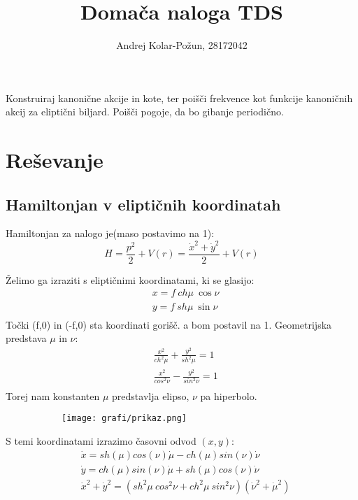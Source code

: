\documentclass{article}
\title{Domača naloga TDS}
\author{Andrej Kolar-Požun, 28172042}
\begin{document}
\maketitle
\newpage
{}


Konstruiraj kanonične akcije in kote, ter poišči frekvence kot funkcije kanoničnih akcij za eliptični biljard. Poišči pogoje, da bo gibanje
periodično.


\section{Reševanje}
\subsection{Hamiltonjan v eliptičnih koordinatah}
Hamiltonjan za nalogo je(maso postavimo na 1):
\begin{equation*}
H = \frac{p^2}{2} + V(r) = \frac{\dot{x}^2 + \dot{y}^2}{2} + V(r)
\end{equation*}

Želimo ga izraziti s eliptičnimi koordinatami, ki se glasijo:
\begin{align*}
&x= f \ ch \mu \ \cos \nu \\
&y = f\  sh \mu \  \sin \nu \\
\end{align*}
Točki (f,0) in (-f,0) sta koordinati gorišč. a bom postavil na 1. 
Geometrijska predstava $\mu$ in $\nu$:
\begin{align*}
& \frac{x^2}{ ch^2 \mu} + \frac{y^2}{ sh^2 \mu} = 1 \\
& \frac{x^2}{ cos^2 \nu} - \frac{y^2}{ sin^2 \nu} = 1 \\
\end{align*}
Torej nam konstanten $\mu$ predstavlja elipso, $\nu$ pa hiperbolo.

\begin{figure}[H]
\centering
\begin{subfigure}{.7\textwidth}
\texttt{[image: grafi/prikaz.png]}
\end{subfigure}
\end{figure}


S temi koordinatami izrazimo časovni odvod $(x,y)$:
\begin{align*}
&\dot{x} = sh(\mu) cos(\nu) \dot{\mu} - ch(\mu) sin(\nu) \dot{\nu} \\
&\dot{y} = ch(\mu) sin(\nu) \dot{\mu} + sh(\mu) cos(\nu) \dot{\nu} \\
&\dot{x}^2 + \dot{y}^2 =  (sh^2 \mu \ cos^2 \nu + ch^2 \mu \ sin^2 \nu) (\dot{\nu}^2 + \dot{\mu}^2) 
\end{align*}
\end{document}
